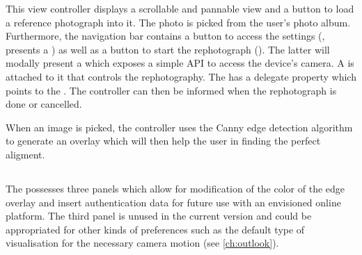 \setlength\emergencystretch{2em}
This view controller displays a scrollable and pannable view and a button
 to load a reference photograph into it. The
photo is picked from the user's photo album.  Furthermore, the navigation bar
contains a button to access the settings
(, presents a
) as well as a button to start the rephotograph
(). The latter
will modally present a  which exposes a simple API
to access the device's camera. A
 is attached to it that controls the rephotography. The
 has a delegate property which points to the
. The controller can then be informed when the
rephotograph is done or cancelled.


When an image is picked, the controller uses the Canny edge detection algorithm
\citep{canny1986} to generate an overlay which will then help the user in
finding the perfect aligment.


\subsection{}

The  possesses three panels which allow for
modification of the color of the edge overlay and insert authentication data for
future use with an envisioned online platform. The third panel is unused in the current
version and could be appropriated for other kinds of preferences such as the default type
of visualisation for the necessary camera motion (see \autoref{ch:outlook}).


\subsection{}

